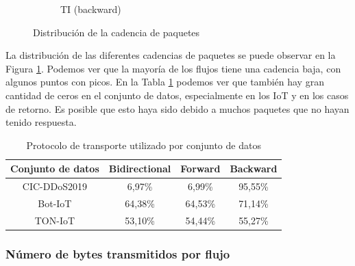 \begin{figure}[H]
\begin{subfigure}[b]{0.26\textwidth}
        \caption{TI (backward)}
    \end{subfigure}
    \hfill
       \caption{Distribución de la cadencia de paquetes}
       \label{fig:packet_pincer_packet_second}
\end{figure}

La distribución de las diferentes cadencias de paquetes se puede observar en la Figura \ref{fig:packet_pincer_packet_second}. Podemos ver que la mayoría de los flujos tiene una cadencia baja, con algunos puntos con picos. En la Tabla \ref{table:packet_pincer_packet_second_zeroes} podemos ver que también hay gran cantidad de ceros en el conjunto de datos, especialmente en los IoT y en los casos de retorno. Es posible que esto haya sido debido a muchos paquetes que no hayan tenido respuesta.

\begin{table}[H]
    \centering
    \begin{tabular}{|c | c c c |}
        \hline
        \textbf{Conjunto de datos} & \textbf{Bidirectional} & \textbf{Forward} & \textbf{Backward} \\ \hline
        CIC-DDoS2019               & 6,97\%                 & 6,99\%           & 95,55\% \\
        Bot-IoT                    & 64,38\%                & 64,53\%          & 71,14\% \\
        TON-IoT                    & 53,10\%                & 54,44\%          & 55,27\% \\
        \hline
    \end{tabular}
    \caption{Protocolo de transporte utilizado por conjunto de datos}
    \label{table:packet_pincer_packet_second_zeroes}
\end{table}

\subsubsection{Número de bytes transmitidos por flujo}

